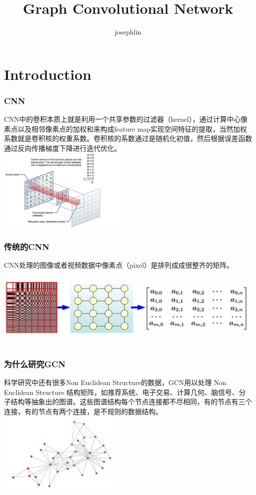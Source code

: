 \documentclass{beamer}
\title{Graph Convolutional Network}
\author{josephlin}
\begin{document}

\section{Introduction}
\begin{frame}
    \frametitle{CNN}
    CNN中的卷积本质上就是利用一个共享参数的过滤器（kernel），通过计算中心像素点以及相邻像素点的加权和来构成feature map实现空间特征的提取，当然加权系数就是卷积核的权重系数。卷积核的系数通过是随机化初值，然后根据误差函数通过反向传播梯度下降进行迭代优化。\\
    \includegraphics[height=4cm]{images/feature_map.jpg}
\end{frame}

\begin{frame}
    \frametitle{传统的CNN}
    CNN处理的图像或者视频数据中像素点（pixel）是排列成成很整齐的矩阵。\\
    \includegraphics[height=4cm]{images/Euclidean_Structure.jpg}\\
\end{frame}

\begin{frame}
    \frametitle{为什么研究GCN}

    科学研究中还有很多Non Euclidean Structure的数据，GCN用以处理 Non Euclidean Structure 结构矩阵，如推荐系统、电子交易、计算几何、脑信号、分子结构等抽象出的图谱。这些图谱结构每个节点连接都不尽相同，有的节点有三个连接，有的节点有两个连接，是不规则的数据结构。
    \includegraphics[height=4cm]{images/Non_Eclidean_Structure.jpg}
\end{frame}
\end{document}
